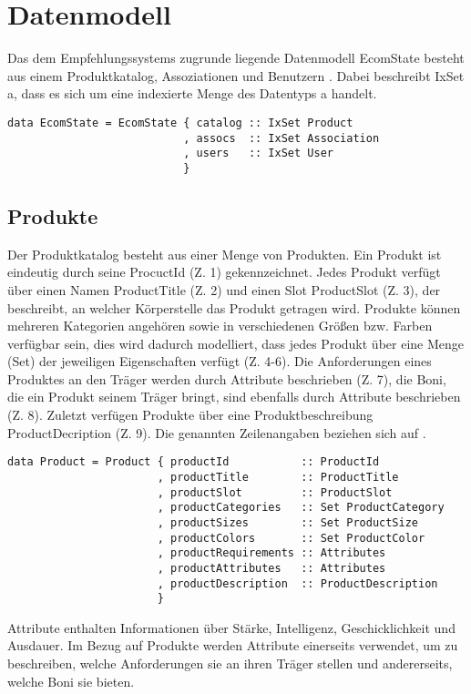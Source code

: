 \chapter{Datenmodell}
Das dem Empfehlungssystems zugrunde liegende Datenmodell \textsf{EcomState} besteht aus einem Produktkatalog, Assoziationen und Benutzern . Dabei beschreibt \textsf{IxSet a}, dass es sich um eine indexierte Menge des Datentyps \textsf{a} handelt.

\begin{lstlisting}[label=code:EcomState,caption=Struktur von \textsf{EcomState}]
data EcomState = EcomState { catalog :: IxSet Product
                           , assocs  :: IxSet Association
                           , users   :: IxSet User
                           }
\end{lstlisting}
\vspace*{-1em}


\section{Produkte}
Der Produktkatalog besteht aus einer Menge von Produkten. Ein Produkt ist eindeutig durch seine \textsf{ProcuctId} (Z. 1) gekennzeichnet. Jedes Produkt verfügt über einen Namen \textsf{ProductTitle} (Z. 2) und einen Slot \textsf{ProductSlot} (Z. 3), der beschreibt, an welcher Körperstelle das Produkt getragen wird. Produkte können mehreren Kategorien angehören sowie in verschiedenen Größen bzw. Farben verfügbar sein, dies wird dadurch modelliert, dass jedes Produkt über eine Menge (\textsf{Set}) der jeweiligen Eigenschaften verfügt (Z. 4-6). Die Anforderungen eines Produktes an den Träger werden durch Attribute beschrieben (Z. 7), die Boni, die ein Produkt seinem Träger bringt, sind ebenfalls durch Attribute beschrieben (Z. 8). Zuletzt verfügen Produkte über eine Produktbeschreibung \textsf{ProductDecription} (Z. 9). Die genannten Zeilenangaben beziehen sich auf .

\begin{lstlisting}[label=code:Product,caption=Struktur von \textsf{Product}]
data Product = Product { productId           :: ProductId
                       , productTitle        :: ProductTitle
                       , productSlot         :: ProductSlot
                       , productCategories   :: Set ProductCategory
                       , productSizes        :: Set ProductSize
                       , productColors       :: Set ProductColor
                       , productRequirements :: Attributes
                       , productAttributes   :: Attributes
                       , productDescription  :: ProductDescription
                       }
\end{lstlisting}
Attribute enthalten Informationen über Stärke, Intelligenz, Geschicklichkeit und Ausdauer. Im Bezug auf Produkte werden Attribute einerseits verwendet, um zu be\-schrei\-ben, welche Anforderungen sie an ihren Träger stellen und andererseits, welche Boni sie bie\-ten.

